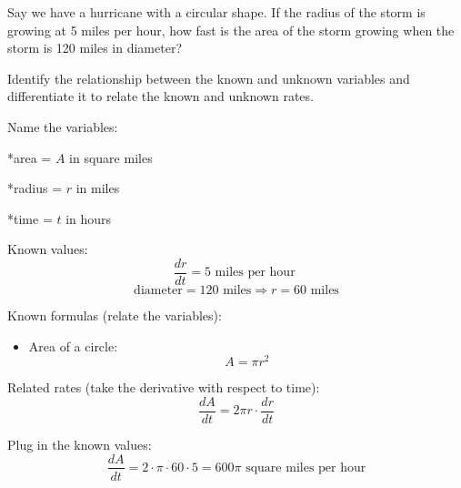 \documentclass{ximera}
\author{Emma Smith Zbarsky}
\begin{document}
\begin{exercise}

Say we have a hurricane with a circular shape. If the radius of the
storm is growing at 5 miles per hour, how fast is the area of the storm
growing when the storm is 120 miles in diameter?


\begin{hint}
Identify the relationship between the known and unknown variables and
differentiate it to relate the known and unknown rates.
\end{hint}


\begin{hint}
Name the variables:

*area = $A$ in square miles

*radius = $r$ in miles

*time = $t$ in hours

Known values: \[\frac{dr}{dt} = 5 \mbox{ miles per hour }\]
\[\mbox{diameter} = 120 \mbox{ miles} \Rightarrow r = 60 \mbox{ miles}\]

Known formulas (relate the variables):

\begin{itemize}
\itemsep1pt\parskip0pt
\item
  Area of a circle: \[A = \pi r^2\]
\end{itemize}

Related rates (take the derivative with respect to time):
\[\frac{dA}{dt} = 2\pi r \cdot \frac{dr}{dt}\]

Plug in the known values:
\[\frac{dA}{dt} = 2\cdot \pi \cdot 60 \cdot 5 = 600 \pi \mbox{ square miles per hour}\]
\end{hint}


\begin{multipleChoice}
\end{multipleChoice}

\end{exercise}
\end{document}
